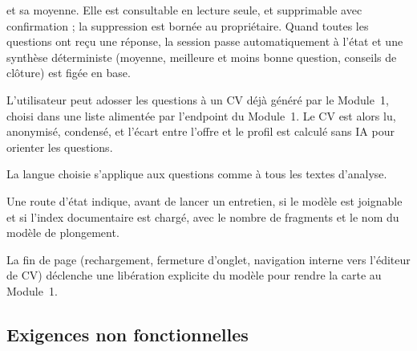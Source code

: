 \begin{description}[leftmargin=1.4em,itemsep=3pt,topsep=3pt,style=nextline]
    et sa moyenne. Elle est consultable en lecture seule, et supprimable avec
    confirmation ; la suppression est bornée au propriétaire. Quand toutes les
    questions ont reçu une réponse, la session passe automatiquement à l'état
     et une synthèse déterministe (moyenne, meilleure et moins
    bonne question, conseils de clôture) est figée en base.
  \item[F5 --- «~Utiliser mon CV~».] L'utilisateur peut adosser les questions à
    un CV déjà généré par le Module~1, choisi dans une liste alimentée par
    l'endpoint  du Module~1. Le CV est alors lu, anonymisé,
    condensé, et l'écart entre l'offre et le profil est calculé sans IA pour
    orienter les questions.
  \item[F6 --- Bilingue français / anglais.] La langue choisie s'applique aux
    questions comme à tous les textes d'analyse.
  \item[F7 --- Diagnostic.] Une route d'état indique, avant de lancer un
    entretien, si le modèle est joignable et si l'index documentaire est chargé,
    avec le nombre de fragments et le nom du modèle de plongement.
  \item[F8 --- Libération de la VRAM.] La fin de page (rechargement, fermeture
    d'onglet, navigation interne vers l'éditeur de CV) déclenche une libération
    explicite du modèle pour rendre la carte au Module~1.
\end{description}

\subsection{Exigences non fonctionnelles}

